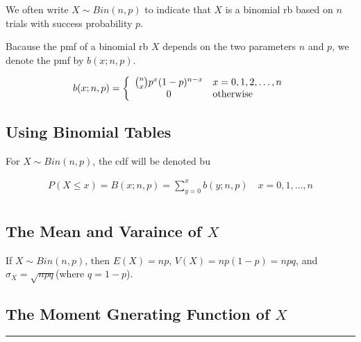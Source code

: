 \begin{notation}
    We often write $X\sim Bin(n, p)$ to indicate that $X$ is a binomial rb based on $n$ trials with success probability $p$.

    Bacause the pmf of a binomial rb $X$ depends on the two parameters $n$ and $p$, we denote the pmf by $b(x; n, p)$.
\end{notation}

\begin{theorem}
    \begin{align*}
        b(x; n, p) = \left\{\begin{array}{cl}
            \binom{n}{x} p^x (1 - p) ^ {n-x} & x = 0, 1, 2, \dots, n \\
            0 & {\rm otherwise} \\
        \end{array}\right.
    \end{align*}
\end{theorem}

\subsection{Using Binomial Tables}

\begin{notation}
    For $X\sim Bin(n, p)$, the cdf will be denoted bu 

    \begin{align*}
        P(X\leq x) = B(x;n,p) = \sum\limits_{y=0}^x b(y;n,p) \quad x=0,1,\dots,n \\
    \end{align*}
\end{notation}

\subsection{The Mean and Varaince of $X$}

\begin{proposition}
    If $X\sim Bin(n,p)$, then $E(X) = np$, $V(X) = np(1-p) = npq$, and $\sigma_X = \sqrt{npq}$(where $q= 1- p$).
\end{proposition}

\subsection{The Moment Gnerating Function of $X$}

\noindent\rule{\textwidth}{1pt}


